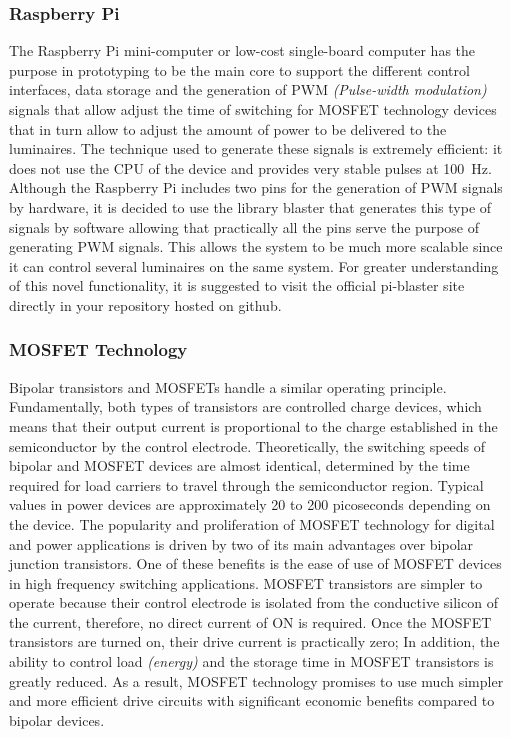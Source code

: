 \documentclass[letterpaper,12pt,twoside]{articleingud}
\begin{document}
\subsubsection{Raspberry Pi}
The Raspberry Pi mini-computer or low-cost single-board computer has the purpose in prototyping to be the main core to support the different control interfaces, data storage and the generation of PWM \textit{(Pulse-width modulation)} signals that allow adjust the time of switching for MOSFET technology devices that in turn allow to adjust the amount of power to be delivered to the luminaires. The technique used to generate these signals is extremely efficient: it does not use the CPU of the device and provides very stable pulses at \SI{100}{\hertz}. Although the Raspberry Pi includes two pins for the generation of PWM signals by hardware, it is decided to use the library blaster that generates this type of signals by software allowing that practically all the pins serve the purpose of generating PWM signals. This allows the system to be much more scalable since it can control several luminaires on the same system.
For greater understanding of this novel functionality, it is suggested to visit the official pi-blaster site directly in your repository hosted on github.\cite{pi-blaster}

\subsubsection{MOSFET Technology}
Bipolar transistors and MOSFETs handle a similar operating principle. Fundamentally, both types of transistors are controlled charge devices, which means that their output current is proportional to the charge established in the semiconductor by the control electrode. Theoretically, the switching speeds of bipolar and MOSFET devices are almost identical, determined by the time required for load carriers to travel through the semiconductor region. Typical values in power devices are approximately 20 to 200 picoseconds depending on the device.
The popularity and proliferation of MOSFET technology for digital and power applications is driven by two of its main advantages over bipolar junction transistors. One of these benefits is the ease of use of MOSFET devices in high frequency switching applications. MOSFET transistors are simpler to operate because their control electrode is isolated from the conductive silicon of the current, therefore, no direct current of ON is required. Once the MOSFET transistors are turned on, their drive current is practically zero; In addition, the ability to control load \textit{(energy)} and the storage time in MOSFET transistors is greatly reduced. As a result, MOSFET technology promises to use much simpler and more efficient drive circuits with significant economic benefits compared to bipolar devices.\cite{texasInstrument}
\end{document}
